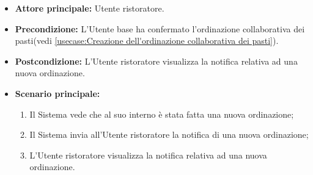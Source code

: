 \label{usecase:Visualizzazione notifica nuovo ordine}
\begin{itemize}
	\item \textbf{Attore principale:} Utente ristoratore.
	
	\item \textbf{Precondizione:} L'Utente base ha confermato l'ordinazione collaborativa dei pasti(vedi \autoref{usecase:Creazione dell'ordinazione collaborativa dei pasti}).

	\item \textbf{Postcondizione:} L'Utente ristoratore visualizza la notifica relativa ad una nuova ordinazione.
     
	\item \textbf{Scenario principale:}
	      \begin{enumerate}
                \item Il Sistema vede che al suo interno è stata fatta una nuova ordinazione;
                \item Il Sistema invia all'Utente ristoratore la notifica di una nuova ordinazione;
                \item L'Utente ristoratore visualizza la notifica relativa ad una nuova ordinazione.
	      \end{enumerate}
\end{itemize}